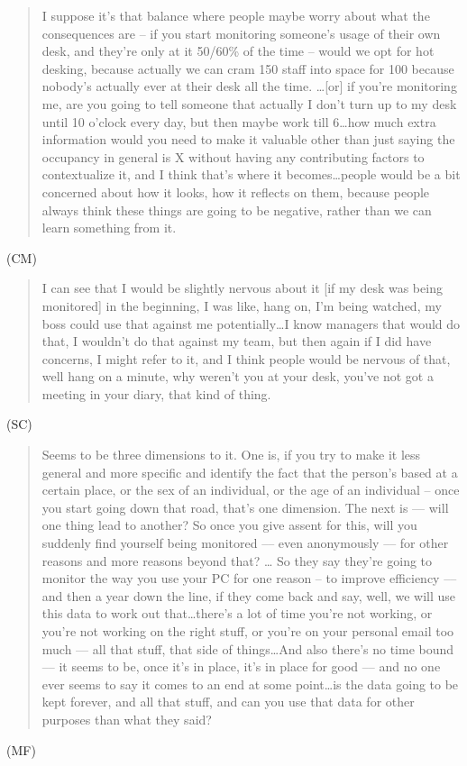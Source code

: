 \begin{quote}I suppose it’s that balance where people maybe worry about what the
consequences are – if you start monitoring someone’s usage of their
own desk, and they’re only at it 50/60\% of the time – would we opt
for hot desking, because actually we can cram 150 staff into space for
100 because nobody’s actually ever at their desk all the time. \ldots  [or]
if you’re monitoring me, are you going to tell someone that actually I
don’t turn up to my desk until 10 o’clock every day, but then maybe
work till 6\ldots how much extra information would you need to make it
valuable other than just saying the occupancy in general is X without
having any contributing factors to contextualize it, and I think
that’s where it becomes\ldots people would be a bit concerned about how it
looks, how it reflects on them, because people always think these
things are going to be negative, rather than we can learn something
from it.
\end{quote}
(CM) 

\begin{quote}I can see that I would be slightly nervous about it [if my desk was
being monitored] in the beginning, I was like, hang on, I’m being
watched, my boss could use that against me potentially\ldots I know managers
that would do that, I wouldn’t do that against my team, but then again
if I did have concerns, I might refer to it, and I think people would
be nervous of that, well hang on a minute, why weren’t you at your
desk, you’ve not got a meeting in your diary, that kind of thing.
\end{quote}
(SC)

\begin{quote}Seems to be three dimensions to it. One is, if you try to make it
less general and more specific and identify the fact that the person’s
based at a certain place, or the sex of an individual, or the age of
an individual – once you start going down that road, that’s one
dimension. The next is --– will one thing lead to another? So once you
give assent for this, will you suddenly find yourself being monitored
--– even anonymously --– for other reasons and more reasons beyond that? \ldots 
So they say they’re going to monitor the way you use your PC for one
reason – to improve efficiency –-- and then a year down the line, if
they come back and say, well, we will use this data to work out
that\ldots there’s a lot of time you’re not working, or you’re not working
on the right stuff, or you’re on your personal email too much --- all
that stuff, that side of things\ldots And also there’s no time bound --– it
seems to be, once it’s in place, it’s in place for good –-- and no one
ever seems to say it comes to an end at some point\ldots is the data going
to be kept forever, and all that stuff, and can you use that data for
other purposes than what they said?
\end{quote}
(MF)

